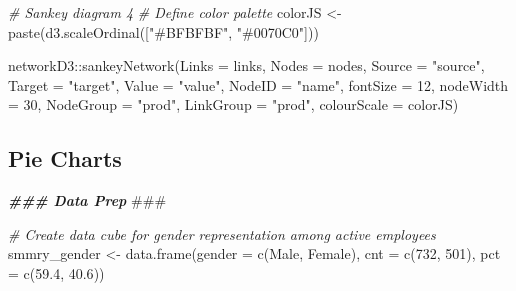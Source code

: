 \documentclass[
]{book}
\newenvironment{Shaded}{\begin{snugshade}}{\end{snugshade}}
\newcommand{\AlertTok}[1]{\textcolor[rgb]{0.94,0.16,0.16}{#1}}
\newcommand{\AttributeTok}[1]{\textcolor[rgb]{0.77,0.63,0.00}{#1}}
\newcommand{\CommentTok}[1]{\textcolor[rgb]{0.56,0.35,0.01}{\textit{#1}}}
\newcommand{\DecValTok}[1]{\textcolor[rgb]{0.00,0.00,0.81}{#1}}
\newcommand{\DocumentationTok}[1]{\textcolor[rgb]{0.56,0.35,0.01}{\textbf{\textit{#1}}}}
\newcommand{\FloatTok}[1]{\textcolor[rgb]{0.00,0.00,0.81}{#1}}
\newcommand{\FunctionTok}[1]{\textcolor[rgb]{0.00,0.00,0.00}{#1}}
\newcommand{\NormalTok}[1]{#1}
\newcommand{\OtherTok}[1]{\textcolor[rgb]{0.56,0.35,0.01}{#1}}
\newcommand{\SpecialCharTok}[1]{\textcolor[rgb]{0.00,0.00,0.00}{#1}}
\newcommand{\StringTok}[1]{\textcolor[rgb]{0.31,0.60,0.02}{#1}}
\begin{document}
\begin{Shaded}
\begin{Highlighting}[]
\CommentTok{\# Sankey diagram 4}
\CommentTok{\# Define color palette}
\NormalTok{colorJS }\OtherTok{\textless{}{-}} \FunctionTok{paste}\NormalTok{(}\StringTok{\textquotesingle{}d3.scaleOrdinal(["\#BFBFBF", "\#0070C0"])\textquotesingle{}}\NormalTok{)}

\NormalTok{networkD3}\SpecialCharTok{::}\FunctionTok{sankeyNetwork}\NormalTok{(}\AttributeTok{Links =}\NormalTok{ links,}
                         \AttributeTok{Nodes =}\NormalTok{ nodes,}
                         \AttributeTok{Source =} \StringTok{"source"}\NormalTok{, }
                         \AttributeTok{Target =} \StringTok{"target"}\NormalTok{,}
                         \AttributeTok{Value =} \StringTok{"value"}\NormalTok{, }
                         \AttributeTok{NodeID =} \StringTok{"name"}\NormalTok{,}
                         \AttributeTok{fontSize =} \DecValTok{12}\NormalTok{, }
                         \AttributeTok{nodeWidth =} \DecValTok{30}\NormalTok{, }
                         \AttributeTok{NodeGroup =} \StringTok{"prod"}\NormalTok{,}
                         \AttributeTok{LinkGroup =} \StringTok{"prod"}\NormalTok{,}
                         \AttributeTok{colourScale =}\NormalTok{ colorJS)}
\end{Highlighting}
\end{Shaded}

\hypertarget{pie-charts-1}{%
\subsection{Pie Charts}\label{pie-charts-1}}

\begin{Shaded}
\begin{Highlighting}[]
\DocumentationTok{\#\#\# Data Prep }\AlertTok{\#\#\#}

\CommentTok{\# Create data cube for gender representation among active employees}
\NormalTok{smmry\_gender }\OtherTok{\textless{}{-}} \FunctionTok{data.frame}\NormalTok{(}\AttributeTok{gender =} \FunctionTok{c}\NormalTok{(}\StringTok{\textquotesingle{}Male\textquotesingle{}}\NormalTok{, }\StringTok{\textquotesingle{}Female\textquotesingle{}}\NormalTok{),}
                           \AttributeTok{cnt =} \FunctionTok{c}\NormalTok{(}\DecValTok{732}\NormalTok{, }\DecValTok{501}\NormalTok{),}
                           \AttributeTok{pct =} \FunctionTok{c}\NormalTok{(}\FloatTok{59.4}\NormalTok{, }\FloatTok{40.6}\NormalTok{))}
\end{Highlighting}
\end{Shaded}
\end{document}
